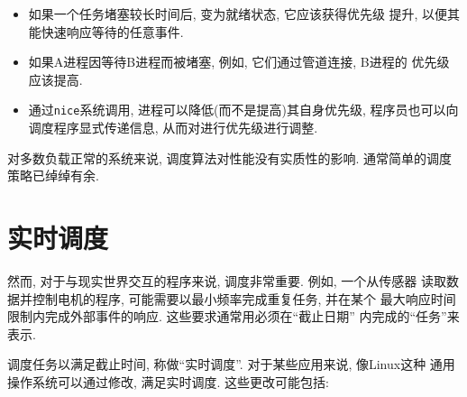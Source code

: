 \documentclass[12pt]{book}
\begin{document}
{\begin{itemize}
\item 如果一个任务堵塞较长时间后, 变为就绪状态, 它应该获得优先级
提升, 以便其能快速响应等待的任意事件. 
%
\item 如果A进程因等待B进程而被堵塞, 例如, 它们通过管道连接, B进程的
优先级应该提高.


\item 通过{\tt nice}系统调用, 进程可以降低(而不是提高)其自身优先级, 程序员也可以向调度程序显式传递信息, 从而对进行优先级进行调整. 

\end{itemize}

对多数负载正常的系统来说, 调度算法对性能没有实质性的影响. 
通常简单的调度策略已绰绰有余. 

\section{实时调度}

然而, 对于与现实世界交互的程序来说, 调度非常重要. 例如, 一个从传感器
读取数据并控制电机的程序, 可能需要以最小频率完成重复任务, 并在某个
最大响应时间限制内完成外部事件的响应. 这些要求通常用必须在``截止日期'' 内完成的``任务''来表示.

调度任务以满足截止时间, 称做``实时调度''. 对于某些应用来说, 像Linux这种
通用操作系统可以通过修改, 满足实时调度. 这些更改可能包括: 

}
\end{document}
